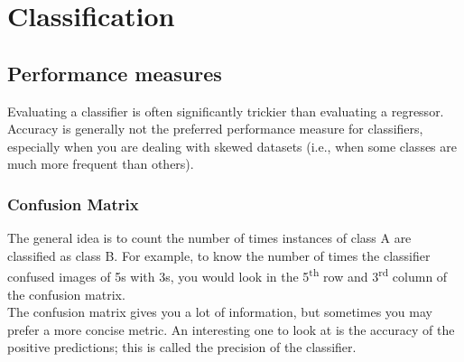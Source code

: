 \documentclass[french]{article}
\begin{document}
\begin{comment}
final_predictions = final_model.predict(X_test_prepared)

final_mse = mean_squared_error(y_test, final_predictions)
final_rmse = np.sqrt(final_mse)
\end{lstlisting}

You might want to have an idea of how precise this estimate is.  For this, you can compute a 95\% confidence interval for the generalization error using scipy.stats.t.interval() :
\begin{lstlisting}
from scipy import stats

confidence = 0.95
squared_errors = (final_predictions - y_test) ** 2
np.sqrt(stats.t.interval(confidence, len(squared_errors) - 1, loc=squared_errors.mean(), scale=stats.sem(squared_errors)))
\end{lstlisting}

\end{comment}

\section{Classification}

\subsection{Performance measures}

Evaluating a classifier is often significantly trickier than evaluating a regressor. Accuracy is generally not the preferred performance measure for classifiers, especially when you are dealing with skewed datasets (i.e., when some classes are much more frequent than others).

\subsubsection{Confusion Matrix}

The general idea is to count the number of times instances of class A are classified as class B. For example, to know the number of times the classifier confused images of 5s with 3s, you would look in the 5\textsuperscript{th} row and 3\textsuperscript{rd} column of the confusion matrix.\\

The confusion matrix gives you a lot of information, but sometimes you may prefer a more concise metric. An interesting one to look at is the accuracy of the positive predictions; this is called the precision of the classifier.
\end{document}
